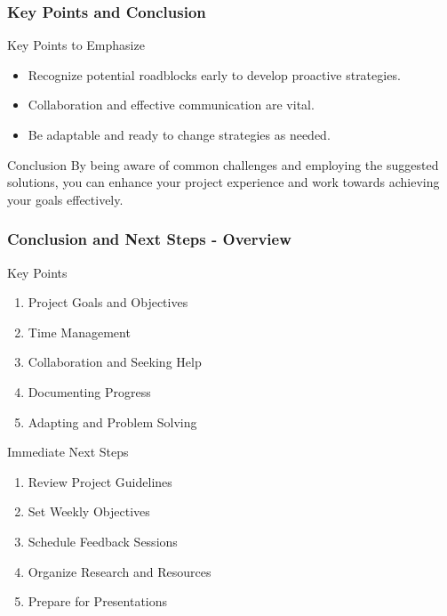 \documentclass[aspectratio=169]{beamer}
\begin{document}
\begin{frame}[fragile]
    \frametitle{Key Points and Conclusion}
    \begin{block}{Key Points to Emphasize}
    \begin{itemize}
        \item Recognize potential roadblocks early to develop proactive strategies.
        \item Collaboration and effective communication are vital.
        \item Be adaptable and ready to change strategies as needed.
    \end{itemize}
    \end{block}

    \begin{block}{Conclusion}
    By being aware of common challenges and employing the suggested solutions, you can enhance your project experience and work towards achieving your goals effectively.
    \end{block}
\end{frame}

\begin{frame}[fragile]
    \frametitle{Conclusion and Next Steps - Overview}
    \begin{block}{Key Points}
        \begin{enumerate}
            \item Project Goals and Objectives
            \item Time Management
            \item Collaboration and Seeking Help
            \item Documenting Progress
            \item Adapting and Problem Solving
        \end{enumerate}
    \end{block}
    \begin{block}{Immediate Next Steps}
        \begin{enumerate}
            \item Review Project Guidelines
            \item Set Weekly Objectives
            \item Schedule Feedback Sessions
            \item Organize Research and Resources
            \item Prepare for Presentations
        \end{enumerate}
    \end{block}
\end{frame}
\end{document}
